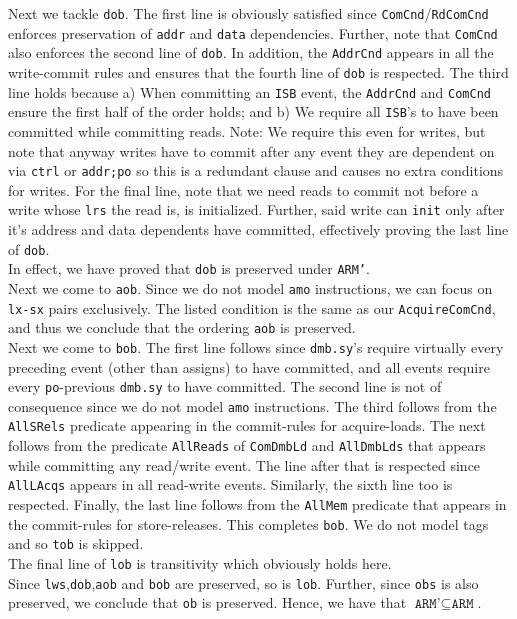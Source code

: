 \documentclass{article}
\newcommand{\var}{\texttt}
\begin{document}
Next we tackle \var{dob}. The first line is obviously satisfied since \var{ComCnd}/\var{RdComCnd} enforces preservation of \var{addr} and \var{data} dependencies. Further, note that \var{ComCnd} also enforces the second line of \var{dob}. In addition, the \var{AddrCnd} appears in all the write-commit rules and ensures that the fourth line of \var{dob} is respected. The third line holds because a) When committing an \var{ISB} event, the \var{AddrCnd} and \var{ComCnd} ensure the first half of the order holds; and b) We require all \var{ISB}'s to have been committed while committing reads. Note: We require this even for writes, but note that anyway writes have to commit after any event they are dependent on via \var{ctrl} or \var{addr;po} so this is a redundant clause and causes no extra conditions for writes. For the final line, note that we need reads to commit not before a write whose \var{lrs} the read is, is initialized. Further, said write can \var{init} only after it's address and data dependents have committed, effectively proving the last line of \var{dob}.\\ 
In effect, we have proved that \var{dob} is preserved under \var{ARM'}.\\
Next we come to \var{aob}. Since we do not model \var{amo} instructions, we can focus on \var{lx-sx} pairs exclusively. The listed condition is the same as our \var{AcquireComCnd}, and thus we conclude that the ordering \var{aob} is preserved.\\
Next we come to \var{bob}. The first line follows since \var{dmb.sy}'s require virtually every preceding event (other than assigns) to have committed, and all events require every \var{po}-previous \var{dmb.sy} to have committed. The second line is not of consequence since we do not model \var{amo} instructions. The third follows from the \var{AllSRels} predicate appearing in the commit-rules for acquire-loads. The next follows from the predicate \var{AllReads} of \var{ComDmbLd} and \var{AllDmbLds} that appears while committing any read/write event. The line after that is respected since \var{AllLAcqs} appears in all read-write events. Similarly, the sixth line too is respected. Finally, the last line follows from the \var{AllMem} predicate that appears in the commit-rules for store-releases. This completes \var{bob}. We do not model tags and so \var{tob} is skipped.\\
The final line of \var{lob} is transitivity which obviously holds here.\\
Since \var{lws},\var{dob},\var{aob} and \var{bob} are preserved, so is \var{lob}. Further, since \var{obs} is also preserved, we conclude that \var{ob} is preserved. Hence, we have that $\var{ARM'} \subseteq \var{ARM}$.\\
\end{document}
